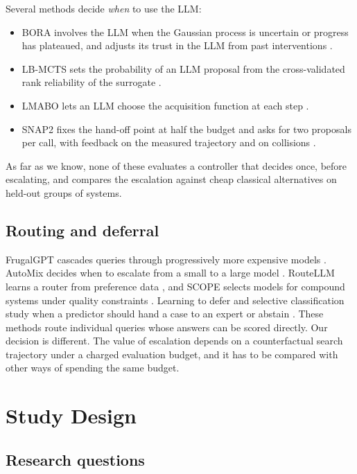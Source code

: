 Several methods decide \emph{when} to use the LLM:
\begin{itemize}
  \item BORA involves the LLM when the Gaussian process is uncertain or progress has plateaued, and adjusts its trust in the LLM from past interventions \cite{cisse2025bora}.
  \item LB-MCTS sets the probability of an LLM proposal from the cross-validated rank reliability of the surrogate \cite{xu2026lbmcts}.
  \item LMABO lets an LLM choose the acquisition function at each step \cite{ngo2026lmabo}.
  \item SNAP2 fixes the hand-off point at half the budget and asks for two proposals per call, with feedback on the measured trajectory and on collisions \cite{srinivasan2026snap2}.
\end{itemize}
As far as we know, none of these evaluates a controller that decides once, before escalating, and compares the escalation against cheap classical alternatives on held-out groups of systems.

\subsection{Routing and deferral}

FrugalGPT cascades queries through progressively more expensive models \cite{chen2023frugalgpt}. AutoMix decides when to escalate from a small to a large model \cite{aggarwal2023automix}. RouteLLM learns a router from preference data \cite{ong2024routellm}, and SCOPE selects models for compound systems under quality constraints \cite{huang2026scope}. Learning to defer and selective classification study when a predictor should hand a case to an expert or abstain \cite{mozannar2020defer,geifman2017selective}. These methods route individual queries whose answers can be scored directly. Our decision is different. The value of escalation depends on a counterfactual search trajectory under a charged evaluation budget, and it has to be compared with other ways of spending the same budget.

\section{Study Design}

\subsection{Research questions}

